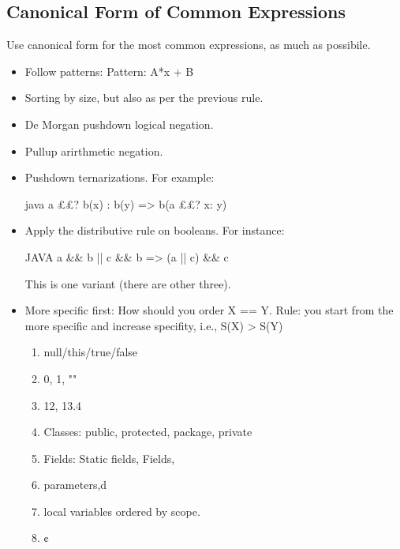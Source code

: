 \subsection{Canonical Form of Common Expressions}
Use canonical form for the most common expressions, as much as possibile.
\begin{itemize}
  \item Follow patterns: Pattern: A*x + B
  \item Sorting by size, but also as per the previous rule.
  \item De Morgan pushdown logical negation.
  \item Pullup arirthmetic negation.
  \item Pushdown ternarizations. For example:
        \begin{code}{java}
a ££? b(x) : b(y) => b(a ££? x: y)
  \end{code}
  \item Apply the distributive rule on booleans. For instance:
        \begin{code}{JAVA}
a && b || c && b => (a || c) && c
  \end{code}
  This is one variant (there are other three).
  \item More specific first: How should you order X == Y.
        Rule: you start from the more specific and increase specifity, i.e.,
        S(X) > S(Y) 
        \begin{enumerate}
          \item null/this/true/false
          \item 0, 1, ""
          \item 12, 13.4
          \item Classes: public, protected, package, private
          \item Fields: Static fields, Fields,
          \item parameters,d
          \item local variables ordered by scope.
          \item ¢
        \end{enumerate}
\end{itemize}

